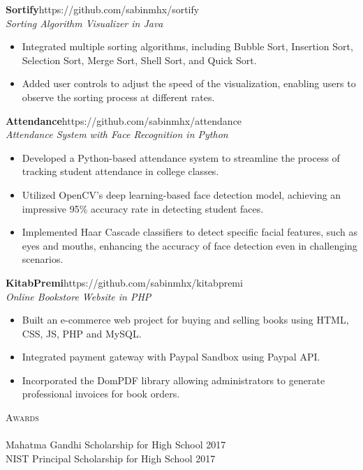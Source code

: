 \documentclass[a4paper]{article}
\newcommand{\lineunder} {
    \vspace*{-8pt} \\
    \hspace*{-18pt} \hrulefill \\
}
\newcommand{\header} [1] {
    {\hspace*{-18pt}\vspace*{6pt} \textsc{#1}}
    \vspace*{-6pt} \lineunder
}
\begin{document}
{\textbf{Sortify}}\hfill https://github.com/sabinmhx/sortify\\
\textit{Sorting Algorithm Visualizer in Java}
\begin{itemize} \itemsep 1pt
	\item Integrated multiple sorting algorithms, including Bubble Sort, Insertion Sort, Selection Sort, Merge Sort, Shell Sort, and Quick Sort.
	\item Added user controls to adjust the speed of the visualization, enabling users to observe the sorting process at different rates.
\end{itemize}
\vspace*{2mm}

{\textbf{Attendance}}\hfill https://github.com/sabinmhx/attendance\\
\textit{Attendance System with Face Recognition in Python}
\begin{itemize} \itemsep 1pt
	\item Developed a Python-based attendance system to streamline the process of tracking student attendance in college classes.
	\item Utilized OpenCV's deep learning-based face detection model, achieving an impressive 95\% accuracy rate in detecting student faces.
    \item Implemented Haar Cascade classifiers to detect specific facial features, such as eyes and mouths, enhancing the accuracy of face detection even in challenging scenarios.
\end{itemize}
\vspace*{2mm}

{\textbf{KitabPremi}}\hfill https://github.com/sabinmhx/kitabpremi\\
\textit{Online Bookstore Website in PHP}
\begin{itemize} \itemsep 1pt
	\item Built an e-commerce web project for buying and selling books using HTML, CSS, JS, PHP and MySQL.  
	\item Integrated payment gateway with Paypal Sandbox using Paypal API.
    \item Incorporated the DomPDF library allowing administrators to generate professional invoices for book orders.
\end{itemize}
\vspace*{2mm}

\header{Awards}
{Mahatma Gandhi Scholarship for High School} \hfill 2017\\
\vspace*{2mm}
{NIST Principal Scholarship for High School} \hfill 2017\\
\vspace*{2mm}

\ 
\end{document}

